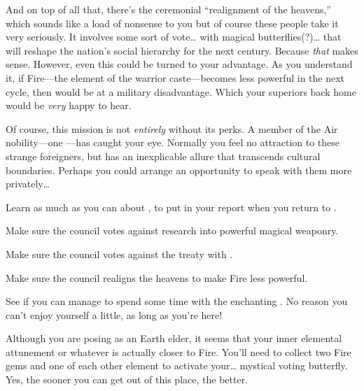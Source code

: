\documentclass[char]{iron}
\begin{document}
And on top of all that, there's the ceremonial ``realignment of the heavens,'' which sounds like a load of nonsense to you but of course these people take it very seriously. It involves some sort of vote\ldots{} with magical butterflies(?)\ldots{} that will reshape the nation's social hierarchy for the next century. Because \emph{that} makes sense. However, even this could be turned to your advantage. As you understand it, if Fire---the element of the warrior caste---becomes less powerful in the next cycle, then \sHomeCountry{} would be at a military disadvantage. Which your superiors back home would be \emph{very} happy to hear.

Of course, this mission is not \emph{entirely} without its perks. A member of the Air nobility---one \cHotPerson{\full}---has caught your eye. Normally you feel no attraction to these strange foreigners, but \cHotPerson{} has an inexplicable allure that transcends cultural boundaries. Perhaps you could arrange an opportunity to speak with them more privately\ldots{}

\begin{itemz}[Goals]
\item Learn as much as you can about \sHomeCountry{}, to put in your report when you return to \sSpyCountry{}.
\item Make sure the council votes against research into powerful magical weaponry.
\item Make sure the council votes against the treaty with \sTreatyCountry{}.
\item Make sure the council realigns the heavens to make Fire less powerful.
\item See if you can manage to spend some time with the enchanting \cHotPerson{}. No reason you can't enjoy yourself a little, as long as you're here!
\end{itemz}

\begin{itemz}[Notes]
\item Although you are posing as an Earth elder, it seems that your inner elemental attunement or whatever is actually closer to Fire. You'll need to collect two Fire gems and one of each other element to activate your\ldots{} mystical voting butterfly. Yes, the sooner you can get out of this place, the better.
\end{itemz}
\end{document}
